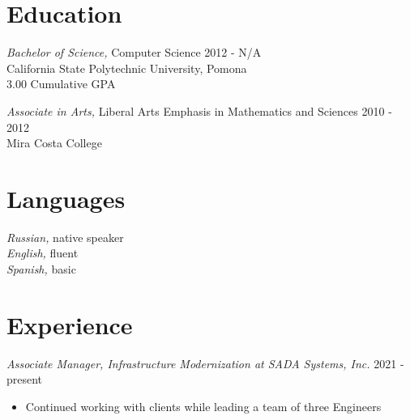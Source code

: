 \documentclass[line]{docs/resume/res}
\begin{document}
\address{https://smaslennikov.com}
\address{Email: me@smaslennikov.com}

\begin{resume}

\section{Education}
  {\sl Bachelor of Science,} Computer Science \hfill 2012 - N/A\\
  California State Polytechnic University, Pomona \\
  3.00 Cumulative GPA

  {\sl Associate in Arts,} Liberal Arts Emphasis in Mathematics and Sciences \hfill 2010 - 2012 \\
  Mira Costa College

\section{Languages}
  {\sl Russian,} native speaker \\
  {\sl English,} fluent \\
  {\sl Spanish,} basic

\section{Experience}
  {\sl Associate Manager, Infrastructure Modernization at SADA Systems, Inc.} \hfill 2021 - present
  \begin{itemize} \itemsep -2pt
    \item Continued working with clients while leading a team of three Engineers
  \end{itemize}


\end{resume}
\end{document}

